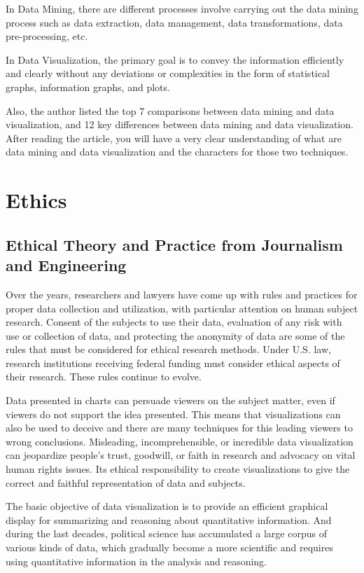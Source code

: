\documentclass[]{book}
\theoremstyle{definition}
\theoremstyle{definition}
\theoremstyle{definition}
\theoremstyle{remark}
\begin{document}
In Data Mining, there are different processes involve carrying out the
data mining process such as data extraction, data management, data
transformations, data pre-processing, etc.

In Data Visualization, the primary goal is to convey the information
efficiently and clearly without any deviations or complexities in the
form of statistical graphs, information graphs, and plots.

Also, the author listed the top 7 comparisons between data mining and
data visualization, and 12 key differences between data mining and data
visualization. After reading the article, you will have a very clear
understanding of what are data mining and data visualization and the
characters for those two techniques.

\chapter{Ethics}\label{ethics}

\section{Ethical Theory and Practice from Journalism and
Engineering}\label{ethical-theory-and-practice-from-journalism-and-engineering}

\citep{poli_social_science} Over the years, researchers and lawyers have
come up with rules and practices for proper data collection and
utilization, with particular attention on human subject research.
Consent of the subjects to use their data, evaluation of any risk with
use or collection of data, and protecting the anonymity of data are some
of the rules that must be considered for ethical research methods. Under
U.S. law, research institutions receiving federal funding must consider
ethical aspects of their research. These rules continue to evolve.

Data presented in charts can persuade viewers on the subject matter,
even if viewers do not support the idea presented. This means that
visualizations can also be used to deceive and there are many techniques
for this leading viewers to wrong conclusions. Misleading,
incomprehensible, or incredible data visualization can jeopardize
people's trust, goodwill, or faith in research and advocacy on vital
human rights issues. Its ethical responsibility to create visualizations
to give the correct and faithful representation of data and subjects.

The basic objective of data visualization is to provide an efficient
graphical display for summarizing and reasoning about quantitative
information. And during the last decades, political science has
accumulated a large corpus of various kinds of data, which gradually
become a more scientific and requires using quantitative information in
the analysis and reasoning.
\end{document}
